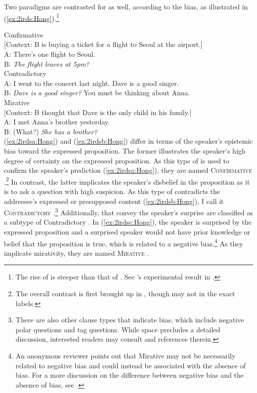 \documentclass[output=paper,colorlinks,citecolor=brown]{langscibook}
\begin{document}
Two paradigms are contrasted for  as well, according to the bias, as illustrated in (\ref{ex:2irds:Hong}).\footnote{The rise of  is steeper than that of . See \citet{jeong2018intonation}'s experimental result in .}

\ea \label{ex:2irds:Hong}
    \ea \label{ex:2irdsa:Hong} Confirmative \\
    {[Context: B is buying a ticket for a flight to Seoul at the airport.]}\\
    A: There's one flight to Seoul.\\
    B: \textit{The flight leaves at 5pm?}\\
    \ex \label{ex:2irdsb:Hong} Contradictory \\
    A: I went to the concert last night. Dave is a good singer.\\
    B: \textit{Dave is a good singer?} You must be thinking about Anna.\\
    \ex \label{ex:2irdsc:Hong} Mirative \\
    {[Context: B thought that Dave is the only child in his family.]}\\
    A: I met Anna’s brother yesterday.\\
    B: (What?) \textit{She has a brother?}\\
    \z
\z
(\ref{ex:2irdsa:Hong}) and (\ref{ex:2irdsb:Hong}) differ in terms of the speaker’s epistemic bias toward the expressed proposition. The former illustrates the speaker’s high degree of certainty on the expressed proposition. As this type of  is used to confirm the speaker’s prediction (\ref{ex:2irdsa:Hong}), they are named \textsc{Confirmative} .\footnote{The overall contrast is first brought up in \citet{gunlogson2003true, gunlogson2008question}, though may not in the exact labels.} In contrast, the latter implicates the speaker’s disbelief in the proposition as it is to ask a question with high suspicion. As this type of  contradicts the addressee’s expressed or presupposed content (\ref{ex:2irdsb:Hong}), I call it \textsc{Contradictory} .\footnote{There are also other clause types that indicate bias, which include negative polar questions and tag questions. While space precludes a detailed discussion, interested readers may consult \citet{romero2004negative, malamud2015three, farkas2017division, frana2019attitudes, goodhue2022isn} and references therein.} Additionally,  that convey the speaker’s surprise are classified as a subtype of Contradictory  \citep[c.f.,][]{ goodhue2021unified}. In (\ref{ex:2irdsc:Hong}), the speaker is surprised by the expressed proposition and a surprised speaker would not have prior knowledge or belief that the proposition is true, which is related to a negative bias.\footnote{An anonymous reviewer points out that Mirative  may not be necessarily related to negative bias and could instead be associated with the absence of bias. For a more discussion on the difference between negative bias and the absence of bias, see \citet{sudo2013biased}.} As they implicate mirativity, they are named \textsc{Mirative} .
\end{document}
